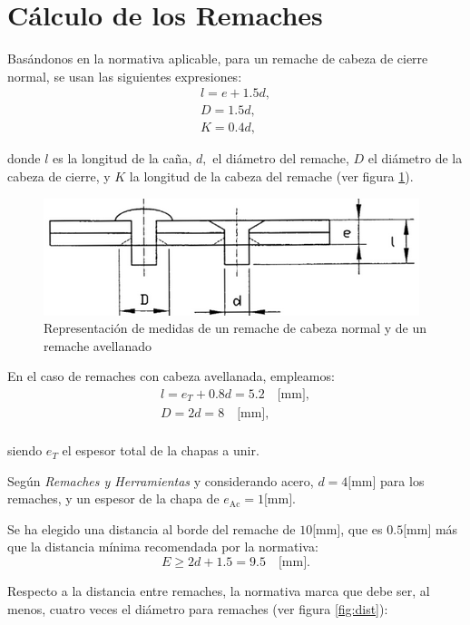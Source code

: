 \section{Cálculo de los Remaches}

Basándonos en la normativa aplicable, para un remache de cabeza de cierre normal, se usan las siguientes expresiones:
\begin{gather}
    l = e + 1.5d, \\
    D = 1.5d, \\
    K = 0.4d,
\end{gather}

donde $l$ es la longitud de la caña, $d,$ el diámetro del remache, $D$ el diámetro de la cabeza de cierre, y $K$ la longitud de la cabeza del remache (ver figura \ref{fig:remaches}).
\begin{figure}[!htb]
    \centering
    \includegraphics[width=0.5\linewidth]{Figures/remaches.png}
    \caption{Representación de medidas de un remache de cabeza normal y de un remache avellanado}
    \label{fig:remaches}
\end{figure}

En el caso de remaches con cabeza avellanada, empleamos:
\begin{gather}
    l = e_T + 0.8d = 5.2 \quad \text{[mm]}, \\
    D = 2d = 8 \quad \text{[mm]}, \\
\end{gather}

siendo $e_T$ el espesor total de la chapas a unir. 

Según \textit{Remaches y Herramientas}\cite{remaches} y considerando acero, $d = 4 \text{[mm]}$ para los remaches, y un espesor de la chapa de $e_{\text{Ac}} = 1 \text{[mm]}$.

Se ha elegido una distancia al borde del remache de $10 \text{[mm]}$, que es $0.5 \text{[mm]}$ más que la distancia mínima recomendada por la normativa:
\begin{equation}
    E \ge 2d + 1.5 = 9.5 \quad \text{[mm]}.
\end{equation}

Respecto a la distancia entre remaches, la normativa marca que debe ser, al menos, cuatro veces el diámetro para remaches (ver figura \ref{fig:dist}):

